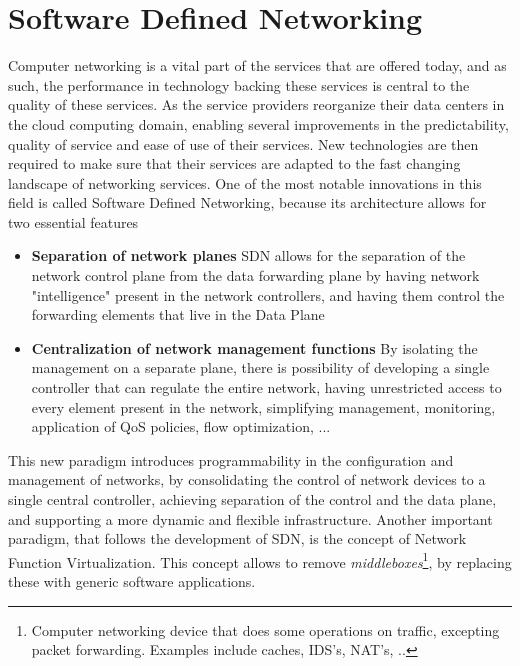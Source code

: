 \chapter{Software Defined Networking} \label{chap:sdn} %

Computer networking is a vital part of the services that are offered today, and as such, the performance in technology backing these services is central to the quality of these services. As the service providers reorganize their
data centers in the cloud computing domain, enabling several improvements in the predictability, quality of service and ease of use of their services. New technologies are then required to make sure that their services are adapted
to the fast changing landscape of networking services. One of the most notable innovations in this field is called Software Defined Networking, because its architecture allows for two essential features

\begin {itemize}
    \item \textbf{Separation of network planes} SDN allows for the separation of the network control plane from the data forwarding plane by having network "intelligence" present in the network controllers, and having them
control the forwarding elements that live in the Data Plane
    \item \textbf{Centralization of network management functions} By isolating the management on a separate plane, there is possibility of developing a single controller that can regulate the entire network, having unrestricted access 
        to every element present in the network, simplifying management, monitoring, application of QoS policies, flow optimization, ...
\end {itemize}

\par This new paradigm introduces programmability in the configuration and management of networks, by consolidating the control of network devices to a single central controller, achieving separation of the control and the 
data plane, and supporting a more dynamic and flexible infrastructure. Another important paradigm, that follows the development of SDN, is the concept of Network Function Virtualization. This concept allows to remove 
\textit {middleboxes}\footnote {Computer networking device that does some operations on traffic, excepting packet forwarding. Examples include caches, IDS's, NAT's, ..}, by replacing these with generic software 
applications.

